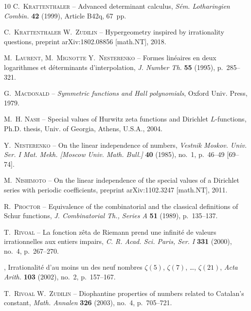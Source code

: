 \documentclass{article}
\numberwithin{equation}{section}
\theoremstyle{remark}
\begin{document}
\begin{thebibliography}{10}
{\scshape C.~Krattenthaler} -- {\og Advanced determinant calculus\fg},
  \emph{S\'em. Lotharingien Combin.} \textbf{42} (1999), Article B42q, 67~pp.

{\scshape C.~Krattenthaler {\normalfont \smfandname} W.~Zudilin} -- {\og
  Hypergeometry inspired by irrationality questions\fg}, preprint
  arXiv:1802.08856 [math.NT], 2018.

{\scshape M.~Laurent, M.~Mignotte {\normalfont \smfandname} Y.~Nesterenko} --
  {\og Formes lin\'eaires en deux logarithmes et d\'eterminants
  d'interpolation\fg}, \emph{J. Number Th.} \textbf{55} (1995), p.~285--321.

{\scshape G.~Macdonald} -- \emph{Symmetric functions and {H}all polynomials},
  Oxford Univ. Press, 1979.

{\scshape M.~H. Nash} -- {\og Special values of {H}urwitz zeta functions and
  {D}irichlet ${L}$-functions\fg}, Ph.{D}. thesis, Univ. of Georgia, Athens,
  U.S.A., 2004.

{\scshape Y.~Nesterenko} -- {\og On the linear independence of numbers\fg},
  \emph{Vestnik Moskov. Univ. Ser. I Mat. Mekh. [Moscow Univ. Math. Bull.]}
  \textbf{40} (1985), no.~1, p.~46--49 [69--74].

{\scshape M.~Nishimoto} -- {\og On the linear independence of the special
  values of a {D}irichlet series with periodic coefficients\fg}, preprint arXiv:1102.3247 [math.NT], 2011.

{\scshape R.~Proctor} -- {\og Equivalence of the combinatorial and the
  classical definitions of {S}chur functions\fg}, \emph{J. Combinatorial Th.,
  Series A} \textbf{51} (1989), p.~135--137.

{\scshape T.~Rivoal} -- {\og La fonction z\^eta de {R}iemann prend une
  infinit{\'e} de valeurs irrationnelles aux entiers impairs\fg}, \emph{C. R.
  Acad. Sci. Paris, Ser. I} \textbf{331} (2000), no.~4, p.~267--270.

\bysame , {\og Irrationalit{\'e} d'au moins un des neuf nombres $\zeta(5)$,
  $\zeta(7)$, \ldots, $\zeta(21)$\fg}, \emph{Acta Arith.} \textbf{103} (2002),
  no.~2, p.~157--167.

{\scshape T.~Rivoal {\normalfont \smfandname} W.~Zudilin} -- {\og Diophantine
  properties of numbers related to {C}atalan's constant\fg}, \emph{Math.
  Annalen} \textbf{326} (2003), no.~4, p.~705--721.


\end{thebibliography}
\end{document}
